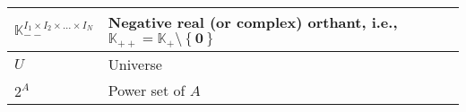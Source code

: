 \begin{xltabular}{\textwidth}{XX}
	\(\mathbb{K}_{--}^{I_1\times I_2 \times \dots \times I_N}\)                                        & Negative real (or complex) orthant, i.e., \(\mathbb{K}_{++} = \mathbb{K}_{+}\setminus\left\{ \mathbf{0} \right\}\) \cite{boydConvexOptimization2004} \\ \hline
	\(U\)                                                      & Universe                                                                                                                                           \\ \hline
	\(2^A\)                                                    & Power set of \(A\)                                                                                                                                 \\ \hline
\end{xltabular}

